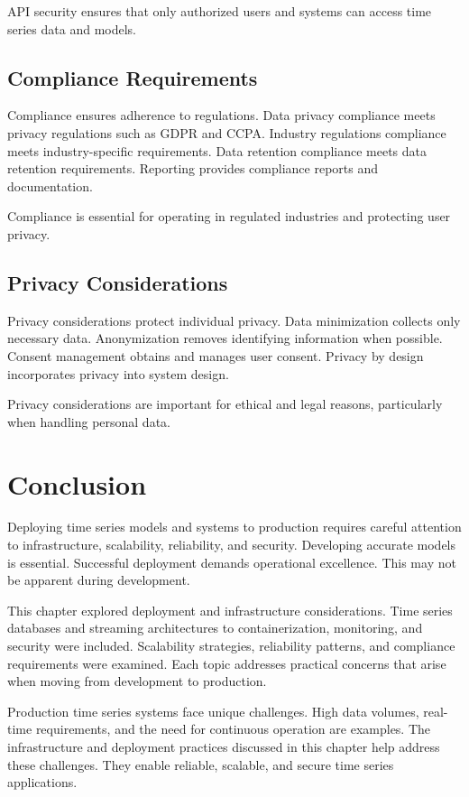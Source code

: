 API security ensures that only authorized users and systems can access time series data and models.

\subsection{Compliance Requirements}

Compliance ensures adherence to regulations. Data privacy compliance meets privacy regulations such as GDPR and CCPA. Industry regulations compliance meets industry-specific requirements. Data retention compliance meets data retention requirements. Reporting provides compliance reports and documentation.

Compliance is essential for operating in regulated industries and protecting user privacy.

\subsection{Privacy Considerations}

Privacy considerations protect individual privacy. Data minimization collects only necessary data. Anonymization removes identifying information when possible. Consent management obtains and manages user consent. Privacy by design incorporates privacy into system design.

Privacy considerations are important for ethical and legal reasons, particularly when handling personal data.

\section{Conclusion}

Deploying time series models and systems to production requires careful attention to infrastructure, scalability, reliability, and security. Developing accurate models is essential. Successful deployment demands operational excellence. This may not be apparent during development.

This chapter explored deployment and infrastructure considerations. Time series databases and streaming architectures to containerization, monitoring, and security were included. Scalability strategies, reliability patterns, and compliance requirements were examined. Each topic addresses practical concerns that arise when moving from development to production.

Production time series systems face unique challenges. High data volumes, real-time requirements, and the need for continuous operation are examples. The infrastructure and deployment practices discussed in this chapter help address these challenges. They enable reliable, scalable, and secure time series applications.

